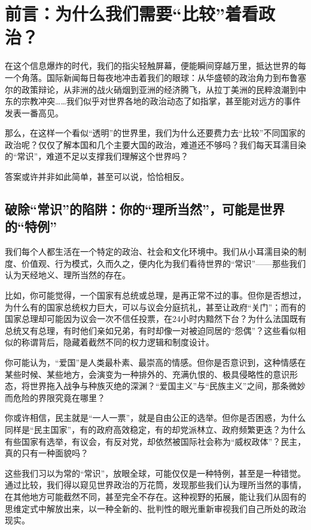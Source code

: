 

\chapter{前言：为什么我们需要“比较”着看政治？}

在这个信息爆炸的时代，我们的指尖轻触屏幕，便能瞬间穿越万里，抵达世界的每一个角落。国际新闻每日每夜地冲击着我们的眼球：从华盛顿的政治角力到布鲁塞尔的政策辩论，从非洲的战火硝烟到亚洲的经济腾飞，从拉丁美洲的民粹浪潮到中东的宗教冲突……我们似乎对世界各地的政治动态了如指掌，甚至能对远方的事件发表一番高见。

那么，在这样一个看似“透明”的世界里，我们为什么还要费力去“比较”不同国家的政治呢？仅仅了解本国和几个主要大国的政治，难道还不够吗？我们每天耳濡目染的“常识”，难道不足以支撑我们理解这个世界吗？

答案或许并非如此简单，甚至可以说，恰恰相反。

\section{破除“常识”的陷阱：你的“理所当然”，可能是世界的“特例”}

我们每个人都生活在一个特定的政治、社会和文化环境中。我们从小耳濡目染的制度、价值观、行为模式，久而久之，便内化为我们看待世界的“常识”——那些我们认为天经地义、理所当然的存在。

比如，你可能觉得，一个国家有总统或总理，是再正常不过的事。但你是否想过，为什么有的国家总统权力巨大，可以与议会分庭抗礼，甚至让政府“关门”；而有的国家总理却可能因为议会一次不信任投票，在24小时内黯然下台？为什么法国既有总统又有总理，有时他们亲如兄弟，有时却像一对被迫同居的“怨偶”？这些看似相似的称谓背后，隐藏着截然不同的权力逻辑和制度设计。

你可能认为，“爱国”是人类最朴素、最崇高的情感。但你是否意识到，这种情感在某些时候、某些地方，会演变为一种排外的、充满仇恨的、极具侵略性的意识形态，将世界拖入战争与种族灭绝的深渊？“爱国主义”与“民族主义”之间，那条微妙而危险的界限究竟在哪里？

你或许相信，民主就是“一人一票”，就是自由公正的选举。但你是否困惑，为什么同样是“民主国家”，有的政府高效稳定，有的却党派林立、政府频繁更迭？为什么有些国家有选举，有议会，有反对党，却依然被国际社会称为“威权政体”？民主，真的只有一种面貌吗？

这些我们习以为常的“常识”，放眼全球，可能仅仅是一种特例，甚至是一种错觉。通过比较，我们得以窥见世界政治的万花筒，发现那些我们认为理所当然的事情，在其他地方可能截然不同，甚至完全不存在。这种视野的拓展，能让我们从固有的思维定式中解放出来，以一种全新的、批判性的眼光重新审视我们自己所处的政治现实。

